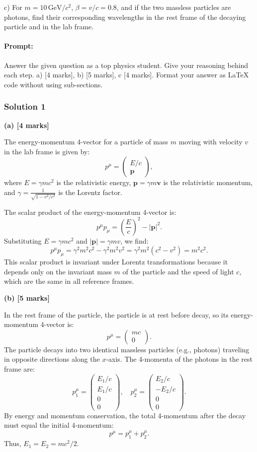 \documentclass{article}
\begin{document}
c) For \(m = 10 \, \text{GeV}/c^2\), \(\beta = v/c = 0.8\), and if the two massless particles are photons, find their corresponding wavelengths in the rest frame of the decaying particle and in the lab frame. \\

\paragraph{Prompt: \\} 
Answer the given question as a top physics student. Give your reasoning behind each step. a) [4 marks], b) [5 marks], c [4 marks].
Format your answer as LaTeX code without using sub-sections.


\subsubsection{Solution 1}
\textbf{(a) [4 marks]} 

The energy-momentum 4-vector for a particle of mass \(m\) moving with velocity \(v\) in the lab frame is given by:
\[
p^\mu = \begin{pmatrix}
E/c \\
\mathbf{p}
\end{pmatrix},
\]
where \(E = \gamma m c^2\) is the relativistic energy, \(\mathbf{p} = \gamma m \mathbf{v}\) is the relativistic momentum, and \(\gamma = \frac{1}{\sqrt{1 - v^2/c^2}}\) is the Lorentz factor. 

The scalar product of the energy-momentum 4-vector is:
\[
p^\mu p_\mu = \left(\frac{E}{c}\right)^2 - |\mathbf{p}|^2.
\]
Substituting \(E = \gamma mc^2\) and \(|\mathbf{p}| = \gamma mv\), we find:
\[
p^\mu p_\mu = \gamma^2 m^2 c^2 - \gamma^2 m^2 v^2 = \gamma^2 m^2 (c^2 - v^2) = m^2 c^2.
\]
This scalar product is invariant under Lorentz transformations because it depends only on the invariant mass \(m\) of the particle and the speed of light \(c\), which are the same in all reference frames.

\textbf{(b) [5 marks]}

In the rest frame of the particle, the particle is at rest before decay, so its energy-momentum 4-vector is:
\[
p^\mu = \begin{pmatrix}
mc \\
0
\end{pmatrix}.
\]
The particle decays into two identical massless particles (e.g., photons) traveling in opposite directions along the \(x\)-axis. The 4-momenta of the photons in the rest frame are:
\[
p_1^\mu = \begin{pmatrix}
E_1/c \\
E_1/c \\
0 \\
0
\end{pmatrix}, \quad
p_2^\mu = \begin{pmatrix}
E_2/c \\
-E_2/c \\
0 \\
0
\end{pmatrix}.
\]
By energy and momentum conservation, the total 4-momentum after the decay must equal the initial 4-momentum:
\[
p^\mu = p_1^\mu + p_2^\mu.
\]
Thus, \(E_1 = E_2 = mc^2/2\).
\end{document}
